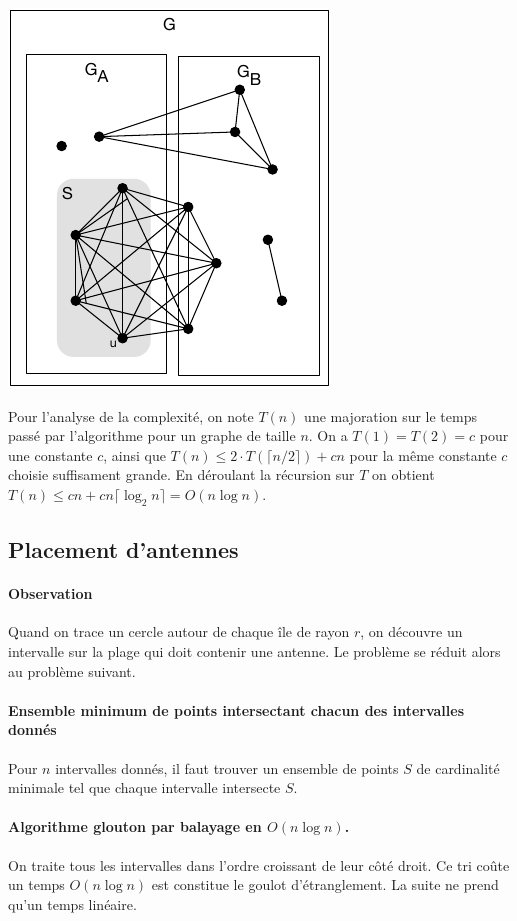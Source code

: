 \documentclass[12pt]{article}
\begin{document}
     \centerline{\includegraphics{grande_clique.pdf}}

     Pour l'analyse de la complexité, on note $T(n)$ une majoration sur le temps passé par l'algorithme pour un graphe de taille $n$.  On a $T(1) = T(2) = c$ pour une constante $c$, ainsi que $T(n) \leq 2\cdot T(\lceil n/2 \rceil)  + cn$ pour la même constante $c$ choisie suffisament grande.  En déroulant la récursion sur $T$ on obtient $T(n) \leq c n + c n  \lceil \log_2 n \rceil = O(n \log n)$.

    \subsection{Placement d'antennes}


\paragraph{Observation}
Quand on trace un cercle autour de chaque île de rayon $r$, on découvre un intervalle sur la plage qui doit contenir une antenne. Le problème se réduit alors au problème suivant.

\paragraph{Ensemble minimum de points intersectant chacun des intervalles donnés}
Pour $n$ intervalles donnés, il faut trouver un ensemble de points $S$ de cardinalité minimale tel que chaque intervalle intersecte $S$.

\paragraph{Algorithme glouton par balayage en $O(n\log n)$.}
On traite tous les intervalles dans l'ordre croissant de leur côté droit.  Ce tri coûte un temps $O(n \log n)$ est constitue le goulot d'étranglement. La suite ne prend qu'un temps linéaire.
\end{document}
